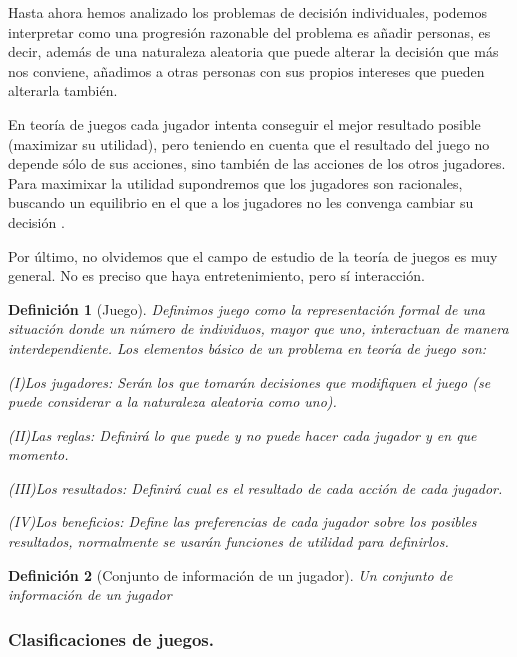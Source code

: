 \documentclass[16pt, a4paper]{article} %
\newtheorem{definicion}{Definición}[section]
\begin{document}
Hasta ahora hemos analizado los problemas de decisión individuales, podemos interpretar como una progresión razonable del problema es añadir personas, es decir, además de una naturaleza aleatoria que puede alterar la decisión que más nos conviene, añadimos a otras personas con sus propios intereses que pueden alterarla también.

En teoría de juegos cada jugador intenta conseguir el mejor resultado posible (maximizar su utilidad), pero teniendo en cuenta que el resultado del juego no depende sólo de sus acciones, sino también de las acciones de los otros jugadores. Para maximixar la utilidad supondremos que los jugadores son racionales, buscando un equilibrio en el que a los jugadores no les convenga cambiar su decisión .


Por último, no olvidemos que el campo de estudio de la teoría de juegos es muy general. No es preciso que haya entretenimiento, pero sí interacción.
\begin{definicion}[Juego]
Definimos juego como la representación formal de una situación donde un número de individuos, mayor que uno, interactuan de manera interdependiente.
Los elementos básico de un problema en teoría de juego son:

(I)Los jugadores: Serán los que tomarán decisiones que modifiquen el juego (se puede considerar a la naturaleza aleatoria como uno).

(II)Las reglas: Definirá lo que puede y no puede hacer cada jugador y en que momento.

(III)Los resultados: Definirá cual es el resultado de cada acción de cada jugador.

(IV)Los beneficios: Define las preferencias de cada jugador sobre los posibles resultados, normalmente se usarán funciones de utilidad para definirlos.

\end{definicion}


\begin{definicion}[Conjunto de información de un jugador]
Un conjunto de información de un jugador 

\end{definicion}



\subsubsection{Clasificaciones de juegos.}
\end{document}
